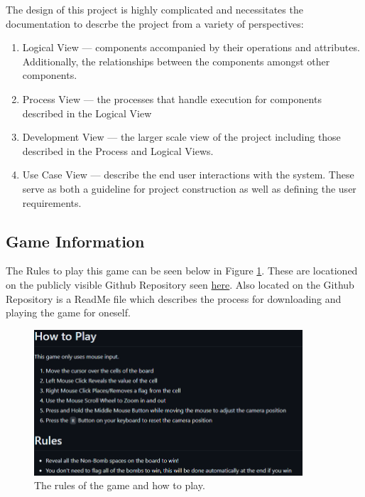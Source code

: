 The design of this project is highly complicated and necessitates the documentation to descrbe the project from a variety of perspectives:
\begin{enumerate}
    \item Logical View --- components accompanied by their operations and attributes. Additionally, the relationships between the components amongst other components.
    \item Process View --- the processes that handle execution for components described in the Logical View
    \item Development View --- the larger scale view of the project including those described in the Process and Logical Views.
    \item Use Case View --- describe the end user interactions with the system. 
    These serve as both a guideline for project construction as well as defining the user requirements.
\end{enumerate}

\subsection{Game Information}
\label{subsec:GameInfo}

The Rules to play this game can be seen below in Figure \ref{Fig:HowToPlay}. These are locationed on the publicly visible Github Repository seen \href{https://github.com/EZRA-DVLPR/MineSweeper3D}{here}.
Also located on the Github Repository is a ReadMe file which describes the process for downloading and playing the game for oneself.

\begin{figure}[h]
    \centering
    \includegraphics[width=10cm]{Images/HowToPlay.png}
       \caption{The rules of the game and how to play.}
           \label{Fig:HowToPlay}
\end{figure}